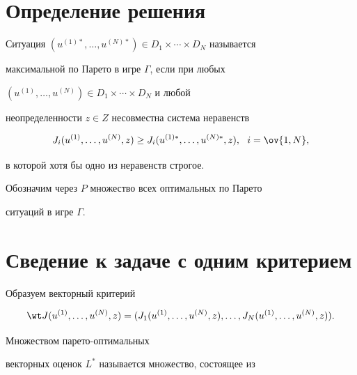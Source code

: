 \section{Определение решения}


 


\begin{defns} 


Ситуация $(u^{(1)*},\dotsc,u^{(N)*})\in D_1\times\dotsb \times 


D_N$ называется 


максимальной по Парето в игре $\Gamma$, если при любых 


$(u^{(1)},\dotsc,u^{(N)})\in D_1\times\dotsb\times D_N$ и любой 


неопределенности $z\in Z$ несовместна система неравенств 


$$ 


J_i(u^{(1)},\dotsc,u^{(N)},z)\ge J_i 


(u^{(1)*},\dotsc,u^{(N)*},z), 


\ \ i=\ov{1,N}, 


$$ 


в которой хотя бы одно из неравенств строгое. 


\end{defns} 





Обозначим через $P$ множество всех оптимальных по Парето


ситуаций в игре $\Gamma$.


 


 


\section{Сведение к задаче с одним критерием} 


 


Образуем векторный критерий 


$$ 


\wt J(u^{(1)},\dotsc,u^{(N)},z)= 


(J_1(u^{(1)},\dotsc,u^{(N)},z),\dotsc,J_N 


(u^{(1)},\dotsc,u^{(N)},z)). 


$$ 


Множеством парето-оптимальных 


векторных оценок $L^*$ называется множество, состоящее из 


